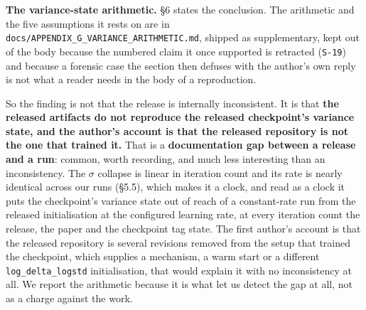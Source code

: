 \documentclass[10pt]{article}
\begin{document}
\begin{center}\small{}\end{center}


\textbf{The variance-state arithmetic.} \S{}6 states the conclusion. The arithmetic and the five assumptions it rests on are in \texttt{docs/\allowbreak{}APPENDIX\_\allowbreak{}G\_\allowbreak{}VARIANCE\_\allowbreak{}ARITHMETIC\allowbreak{}.md}, shipped as supplementary, kept out of the body because the numbered claim it once supported is retracted (\texttt{S-19}) and because a forensic case the section then defuses with the author's own reply is not what a reader needs in the body of a reproduction.

So the finding is not that the release is internally inconsistent. It is that \textbf{the released artifacts do not reproduce the released checkpoint's variance state, and the author's account is that the released repository is not the one that trained it.} That is a \textbf{documentation gap between a release and a run}: common, worth recording, and much less interesting than an inconsistency. The $\sigma$ collapse is linear in iteration count and its rate is nearly identical across our runs (\S{}5.5), which makes it a clock, and read as a clock it puts the checkpoint's variance state out of reach of a constant-rate run from the released initialisation at the configured learning rate, at every iteration count the release, the paper and the checkpoint tag state. The first author's account is that the released repository is several revisions removed from the setup that trained the checkpoint, which supplies a mechanism, a warm start or a different \texttt{log\_delta\_logstd} initialisation, that would explain it with no inconsistency at all. We report the arithmetic because it is what let us detect the gap at all, not as a charge against the work.
\end{document}
